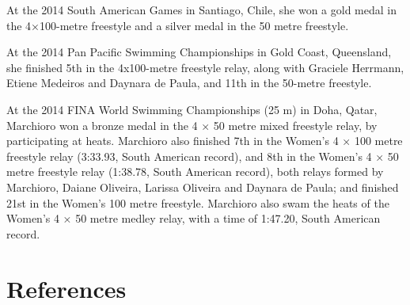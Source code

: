 At the 2014 South American Games in Santiago, Chile, she won a gold
medal in the 4×100-metre freestyle and a silver medal in the 50 metre
freestyle.

At the 2014 Pan Pacific Swimming Championships in Gold Coast,
Queensland, she finished 5th in the 4x100-metre freestyle relay, along
with Graciele Herrmann, Etiene Medeiros and Daynara de Paula, and 11th
in the 50-metre freestyle.

At the 2014 FINA World Swimming Championships (25 m) in Doha, Qatar,
Marchioro won a bronze medal in the 4 × 50 metre mixed freestyle relay,
by participating at heats. Marchioro also finished 7th in the Women's 4
× 100 metre freestyle relay (3:33.93, South American record), and 8th in
the Women's 4 × 50 metre freestyle relay (1:38.78, South American
record), both relays formed by Marchioro, Daiane Oliveira, Larissa
Oliveira and Daynara de Paula; and finished 21st in the Women's 100
metre freestyle. Marchioro also swam the heats of the Women's 4 × 50
metre medley relay, with a time of 1:47.20, South American record.

\section{References}\label{references}
